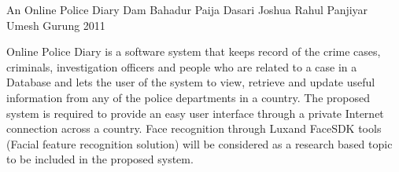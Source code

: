  \begin{conf-abstract}[]
{An Online Police Diary}
{ Dam Bahadur Paija
  Dasari Joshua
  Rahul Panjiyar
  Umesh Gurung 
}
{ 2011 }


      Online Police Diary is a software system that keeps record of the crime cases, criminals, investigation officers and people who are related to a case in a Database and lets the user of the system to view, retrieve and update useful information from any of the police departments in a country. The proposed system is required to provide an easy user interface through a private Internet connection across a country. Face recognition through Luxand FaceSDK tools (Facial feature recognition solution) will be considered as a research based topic to be included in the proposed system. 
  \end{conf-abstract}